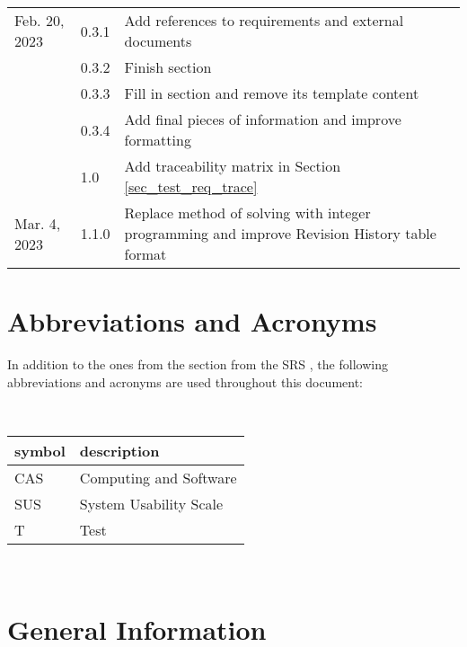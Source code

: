 \documentclass[12pt, titlepage]{article}
\begin{document}
\begin{xltabular}{\textwidth}{llX}
  Feb. 20, 2023       & 0.3.1         & Add references to requirements and
  external documents                                                         \\
  & 0.3.2         & Finish 
  section                                                                    \\
  & 0.3.3         & Fill in 
  section and remove its template content                                    \\
  & 0.3.4         & Add final pieces of information and
  improve formatting                                                         \\
  & 1.0           & Add traceability matrix in Section
  \ref{sec_test_req_trace}                                                   \\
  Mar. 4, 2023 & 1.1.0 & Replace method of solving with integer programming and
  improve Revision History table format \\
\end{xltabular}

\section{Abbreviations and Acronyms} \label{sec_abbrsAcrs}

In addition to the ones from the  section from the
SRS \cite{srs}, the following abbreviations and acronyms are used throughout
this document:

~\newline\noindent
\renewcommand{\arraystretch}{1.2}
\begin{tabular}{l l}
  \toprule
  \textbf{symbol} & \textbf{description}   \\
  \midrule
  CAS             & Computing and Software \\
  SUS             & System Usability Scale \\
  T               & Test                   \\
  \bottomrule
\end{tabular}\\

\newpage


\section{General Information} \label{sec_gen_info}
\end{document}
